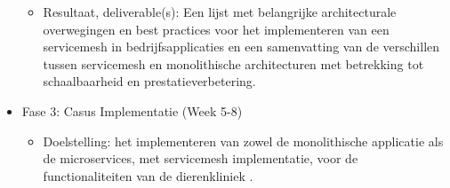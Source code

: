 \begin{itemize}
\begin{itemize}
\begin{itemize}
		\end{itemize}            
		\item Resultaat, deliverable(s): Een lijst met belangrijke architecturale overwegingen en best practices voor het implementeren van een servicemesh in bedrijfsapplicaties en een samenvatting van de verschillen tussen servicemesh en monolithische architecturen met betrekking tot schaalbaarheid en prestatieverbetering.
	\end{itemize}
	\item Fase 3: Casus Implementatie (Week 5-8)
	\begin{itemize}
		\item Doelstelling: het implementeren van zowel de monolithische applicatie als de microservices, met servicemesh implementatie, voor de functionaliteiten van de dierenkliniek \autocite{RameshMF2018}. 
		

\end{itemize}
\end{itemize}

